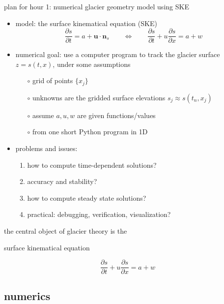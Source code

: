 \documentclass[10pt,dvipsnames]{beamer}
\newcommand{\bn}{\mathbf{n}}
\newcommand{\bu}{\mathbf{u}}
\begin{document}
\begin{frame}{plan for hour 1: numerical glacier geometry model using SKE}

\begin{itemize}
\item \alert{model:} the surface kinematical equation (SKE)
\begin{equation*}
\frac{\partial s}{\partial t} = a + \bu \cdot \bn_s \qquad \iff \qquad \frac{\partial s}{\partial t} + u \frac{\partial s}{\partial x} = a + w
\end{equation*}
\item \alert{numerical goal:} use a computer program to track the glacier surface $z=s(t,x)$, under some assumptions
    \begin{itemize}
    \item[$\circ$] grid of points $\{x_j\}$
    \item[$\circ$] unknowns are the gridded surface elevations $s_j \approx s(t_n,x_j)$
    \item[$\circ$] assume $a,u,w$ are given functions/values 
    \item[$\circ$] from one short Python program in 1D
    \end{itemize}
\item \alert{problems and issues:}
     \begin{enumerate}
     \item how to compute time-dependent solutions?
     \item accuracy and stability?
     \item how to compute steady state solutions?
     \item practical: debugging, verification, visualization?
     \end{enumerate}
\end{itemize}
\end{frame}


\begin{frame}[standout]
the central object of glacier theory is the

surface kinematical equation

\begin{equation*}
\frac{\partial s}{\partial t} + u \frac{\partial s}{\partial x} = a + w
\end{equation*}
\end{frame}


\subsection{numerics}
\end{document}
